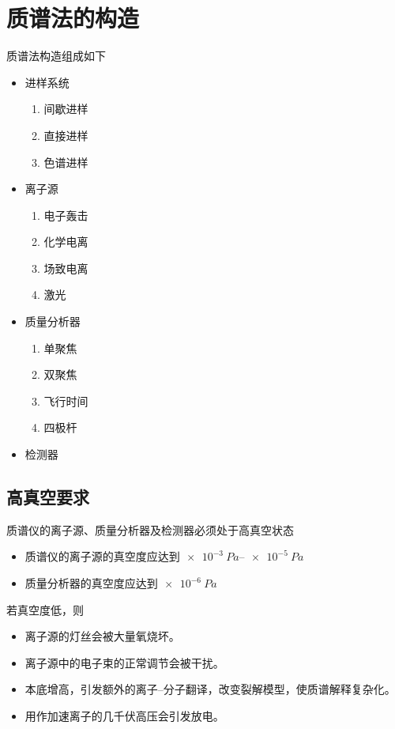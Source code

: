 \section{质谱法的构造}
质谱法构造组成如下
\begin{itemize}
    \item 进样系统
    \begin{enumerate}
        \item 间歇进样
        \item 直接进样
        \item 色谱进样
    \end{enumerate}
    \item 离子源
    \begin{enumerate}
        \item 电子轰击
        \item 化学电离
        \item 场致电离
        \item 激光
    \end{enumerate}
    \item 质量分析器
    \begin{enumerate}
        \item 单聚焦
        \item 双聚焦
        \item 飞行时间
        \item 四极杆
    \end{enumerate}
    \item 检测器
\end{itemize}

\subsection{高真空要求}
质谱仪的离子源、质量分析器及检测器必须处于高真空状态
\begin{itemize}
    \item 质谱仪的离子源的真空度应达到$\SIrange{e-3}{e-5}{Pa}$
    \item 质量分析器的真空度应达到$\SI{e-6}{Pa}$
\end{itemize}
若真空度低，则
\begin{itemize}
    \item 离子源的灯丝会被大量氧烧坏。
    \item 离子源中的电子束的正常调节会被干扰。
    \item 本底增高，引发额外的离子--分子翻译，改变裂解模型，使质谱解释复杂化。
    \item 用作加速离子的几千伏高压会引发放电。
\end{itemize}

